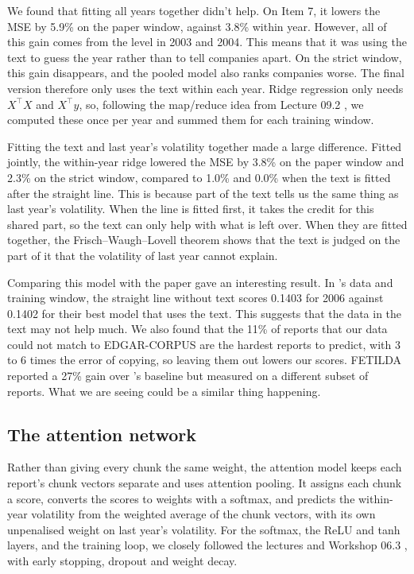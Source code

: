\documentclass[11pt,a4paper]{article}
\begin{document}
We found that fitting all years together didn't help. On Item 7, it lowers the MSE by 5.9\% on the paper window, against 3.8\% within year. However, all of this gain comes from the level in 2003 and 2004. This means that it was using the text to guess the year rather than to tell companies apart. On the strict window, this gain disappears, and the pooled model also ranks companies worse. The final version therefore only uses the text within each year. Ridge regression only needs $X^\top X$ and $X^\top y$, so, following the map/reduce idea from Lecture 09.2 \citep{dst092}, we computed these once per year and summed them for each training window.

Fitting the text and last year's volatility together made a large difference. Fitted jointly, the within-year ridge lowered the MSE by 3.8\% on the paper window and 2.3\% on the strict window, compared to 1.0\% and 0.0\% when the text is fitted after the straight line. This is because part of the text tells us the same thing as last year's volatility. When the line is fitted first, it takes the credit for this shared part, so the text can only help with what is left over. When they are fitted together, the Frisch--Waugh--Lovell theorem shows that the text is judged on the part of it that the volatility of last year cannot explain.

Comparing this model with the paper gave an interesting result. In \citeauthor{kogan2009}'s data and training window, the straight line without text scores 0.1403 for 2006 against 0.1402 for their best model that uses the text. This suggests that the data in the text may not help much. We also found that the 11\% of reports that our data could not match to EDGAR-CORPUS \citep{loukas2021} are the hardest reports to predict, with 3 to 6 times the error of copying, so leaving them out lowers our scores. FETILDA \citep{xia2022} reported a 27\% gain over \citeauthor{kogan2009}'s baseline but measured on a different subset of reports. What we are seeing could be a similar thing happening.

\subsection{The attention network}\label{sec:methods-attention}

Rather than giving every chunk the same weight, the attention model keeps each report's chunk vectors separate and uses attention pooling. It assigns each chunk a score, converts the scores to weights with a softmax, and predicts the within-year volatility from the weighted average of the chunk vectors, with its own unpenalised weight on last year's volatility. For the softmax, the ReLU and tanh layers, and the training loop, we closely followed the lectures and Workshop 06.3 \citep{dst063}, with early stopping, dropout and weight decay.
\end{document}
